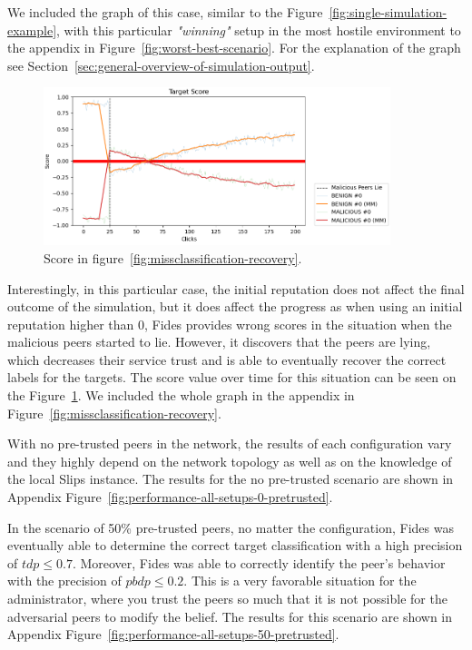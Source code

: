 We included the graph of this case, similar to the Figure~\ref{fig:single-simulation-example}, with this particular \textit{"winning"} setup in the most hostile environment to the appendix in Figure~\ref{fig:worst-best-scenario}. For the explanation of the graph see Section~\ref{sec:general-overview-of-simulation-output}.

\begin{figure}[h!]
    \centering
    \includegraphics[width=0.9\textwidth]{assets/misclassification_score.png}
    \caption{Score in figure~\ref{fig:missclassification-recovery}.}
    \label{fig:missclassification-score-only}
\end{figure}

Interestingly, in this particular case, the initial reputation does not affect the final outcome of the simulation, but it does affect the progress as when using an initial reputation higher than $0$, Fides provides wrong scores in the situation when the malicious peers started to lie.
However, it discovers that the peers are lying, which decreases their service trust and is able to eventually recover the correct labels for the targets.
The score value over time for this situation can be seen on the Figure~\ref{fig:missclassification-score-only}.
We included the whole graph in the appendix in Figure~\ref{fig:missclassification-recovery}.

With no pre-trusted peers in the network, the results of each configuration vary and they highly depend on the network topology as well as on the knowledge of the local Slips instance. The results for the no pre-trusted scenario are shown in Appendix Figure~\ref{fig:performance-all-setups-0-pretrusted}.

In the scenario of 50\% pre-trusted peers, no matter the configuration, Fides was eventually able to determine the correct target classification with a high precision of $tdp \leq 0.7$. Moreover, Fides was able to correctly identify the peer's behavior with the precision of $pbdp \leq 0.2$. This is a very favorable situation for the administrator, where you trust the peers so much that it is not possible for the adversarial peers to modify the belief. The results for this scenario are shown in Appendix Figure~\ref{fig:performance-all-setups-50-pretrusted}.